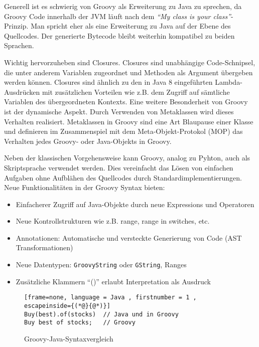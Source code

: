 Generell ist es schwierig von Groovy als Erweiterung zu Java zu sprechen, da Groovy Code innerhalb der JVM läuft nach dem \textit{\enquote{My class is your class}}-Prinzip. Man spricht eher als eine Erweiterung zu Java auf der Ebene des Quellcodes. Der generierte Bytecode bleibt weiterhin kompatibel zu beiden Sprachen.

Wichtig hervorzuheben sind Closures. Closures sind unabhängige Code-Schnipsel, die unter anderem Variablen zugeordnet und Methoden als Argument übergeben werden können.  Closures sind ähnlich zu den in Java 8 eingeführten Lambda-Ausdrücken mit zusätzlichen Vorteilen wie z.B. dem Zugriff auf sämtliche Variablen des übergeordneten Kontexts.
Eine weitere Besonderheit von Groovy ist der dynamische Aspekt. Durch Verwenden von Metaklassen wird dieses Verhalten realisiert.
Metaklassen in Groovy sind eine Art Blaupause einer Klasse und definieren im Zusammenspiel mit dem Meta-Objekt-Protokol (MOP) das Verhalten jedes Groovy- oder Java-Objekts in Groovy.

Neben der klassischen Vorgehensweise kann Groovy, analog zu Pyhton,  auch als Skriptsprache verwendet werden. Dies vereinfacht das Lösen von einfachen Aufgaben ohne Aufblähen des Quellcodes durch Standardimplementierungen.
Neue Funktionalitäten in der Groovy Syntax bieten:

\begin{itemize} [nosep]
	\item Einfacherer Zugriff auf Java-Objekte durch neue Expressions und Operatoren
	\item Neue Kontrollstrukturen wie z.B. range, range in switches, etc.
	\item Annotationen: Automatische und versteckte Generierung von Code (AST Transformationen)
	\item Neue Datentypen: \texttt{GroovyString} oder \texttt{GString}, Ranges
	\item Zusätzliche Klammern \enquote{()} erlaubt Interpretation als Ausdruck
\end{itemize}


\begin{figure} [hbt]
\begin{lstlisting}[frame=none, language = Java , firstnumber = 1 , escapeinside={(*@}{@*)}]
Buy(best).of(stocks)  // Java und in Groovy
Buy best of stocks;   // Groovy
\end{lstlisting}

\caption{Groovy-Java-Syntaxvergleich}
\label{fig-groovy-java}
\end{figure}


